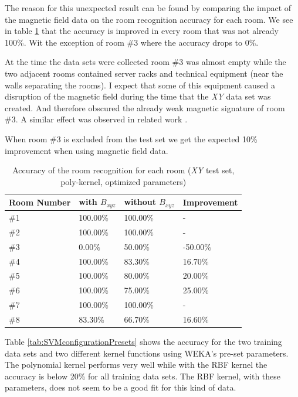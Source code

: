 The reason for this unexpected result can be found by comparing the impact of the magnetic field data on the  room recognition accuracy for each room. We see in table \ref{tab:RoomRecognitionPerRoom} that the accuracy is improved in every room that was not already 100\%. Wit the exception of room \#3 where the accuracy drops to 0\%. 

At the time the data sets were collected room \#3 was almost empty while the two adjacent rooms contained server racks and technical equipment (near the walls separating the rooms). I expect that some of this equipment caused a disruption of the magnetic field during the time that the \emph{XY} data set was created. And therefore obscured the already weak magnetic signature of room \#3. A similar effect was observed in related work \citep{Li2012feasableMagnetic}.

When room \#3 is excluded from the test set we get the expected 10\% improvement when using magnetic field data.

\begin{table}
\centering
\begin{tabular}{l l l l}
\toprule
\textbf{Room Number}&\textbf{with }\boldmath$B_{xyz}$&\textbf{without }\boldmath$B_{xyz}$&\textbf{Improvement} \\
\midrule
\#1&100.00\%&100.00\%&-\\
\#2&100.00\%&100.00\%&-\\
\#3&0.00\%&50.00\%&-50.00\%\\
\#4&100.00\%&83.30\%&16.70\%\\
\#5&100.00\%&80.00\%&20.00\%\\
\#6&100.00\%&75.00\%&25.00\%\\
\#7&100.00\%&100.00\%&-\\
\#8&83.30\%&66.70\%&16.60\%\\
\bottomrule
\end{tabular}
\caption[Room Recognition - Accuracy per room]{Accuracy of the room recognition for each room (\emph{XY} test set, poly-kernel, optimized parameters)}
\label{tab:RoomRecognitionPerRoom}
\end{table}



Table \ref{tab:SVMconfigurationPresets} shows the accuracy for the two training data sets and two different kernel functions using WEKA's pre-set parameters. The polynomial kernel performs very well while with the RBF kernel the accuracy is below 20\% for all training data sets. The RBF kernel, with these parameters, does not seem to be a good fit for this kind of data.

